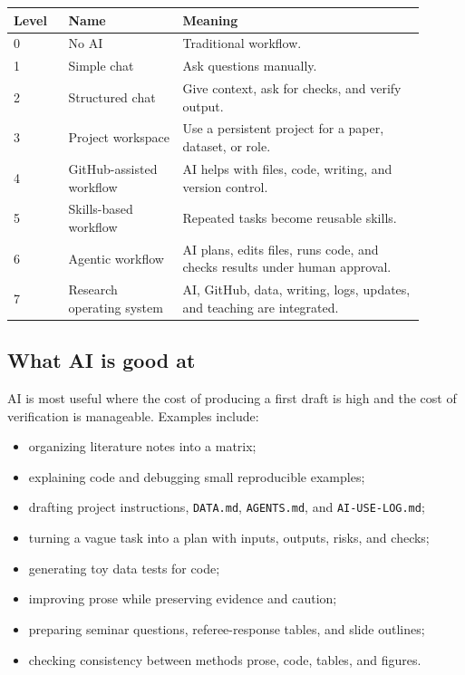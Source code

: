 \documentclass[11pt]{article}
\begin{document}
\begin{longtable}{p{0.12\linewidth}p{0.25\linewidth}p{0.53\linewidth}}
\toprule
\textbf{Level} & \textbf{Name} & \textbf{Meaning}\\
\midrule
0 & No AI & Traditional workflow.\\
1 & Simple chat & Ask questions manually.\\
2 & Structured chat & Give context, ask for checks, and verify output.\\
3 & Project workspace & Use a persistent project for a paper, dataset, or role.\\
4 & GitHub-assisted workflow & AI helps with files, code, writing, and version control.\\
5 & Skills-based workflow & Repeated tasks become reusable skills.\\
6 & Agentic workflow & AI plans, edits files, runs code, and checks results under human approval.\\
7 & Research operating system & AI, GitHub, data, writing, logs, updates, and teaching are integrated.\\
\bottomrule
\end{longtable}

\subsection{What AI is good at}

AI is most useful where the cost of producing a first draft is high and the cost of verification is manageable. Examples include:

\begin{itemize}[leftmargin=2em]
  \item organizing literature notes into a matrix;
  \item explaining code and debugging small reproducible examples;
  \item drafting project instructions, \texttt{DATA.md}, \texttt{AGENTS.md}, and \texttt{AI-USE-LOG.md};
  \item turning a vague task into a plan with inputs, outputs, risks, and checks;
  \item generating toy data tests for code;
  \item improving prose while preserving evidence and caution;
  \item preparing seminar questions, referee-response tables, and slide outlines;
  \item checking consistency between methods prose, code, tables, and figures.
\end{itemize}
\end{document}
